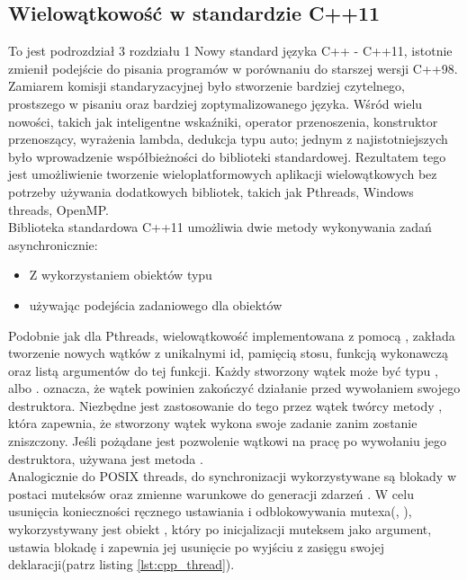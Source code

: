\documentclass[document.tex]{subfiles}
\begin{document}
\subsection{Wielowątkowość w standardzie C++11}
To jest podrozdział 3 rozdziału 1
\indent Nowy standard języka C++ - C++11, istotnie zmienił podejście do pisania programów w porównaniu do starszej wersji C++98. Zamiarem komisji standaryzacyjnej było stworzenie bardziej czytelnego, prostszego w pisaniu oraz bardziej zoptymalizowanego języka.
Wśród wielu nowości, takich jak inteligentne wskaźniki, operator przenoszenia, konstruktor przenoszący, wyrażenia lambda, dedukcja typu auto; jednym z najistotniejszych było wprowadzenie współbieżności do biblioteki standardowej.
Rezultatem tego jest umożliwienie tworzenie wieloplatformowych aplikacji 
wielowątkowych bez potrzeby używania dodatkowych bibliotek, takich jak Pthreads,
Windows threads, OpenMP.\cite{C++_Meyers}\cite{C++_Stroustrup}
\\
\indent Biblioteka standardowa C++11 umożliwia dwie metody wykonywania
zadań asynchronicznie\cite{C++_Meyers}\cite{C++11_iso}:
\begin{itemize}
\item Z wykorzystaniem obiektów typu 
\item używając podejścia zadaniowego dla obiektów 
\end{itemize}
\indent Podobnie jak dla Pthreads, wielowątkowość implementowana z pomocą
, zakłada tworzenie nowych wątków z unikalnymi id, 
pamięcią stosu, funkcją wykonawczą oraz listą argumentów do tej funkcji.
Każdy stworzony wątek może być typu , albo .
 oznacza, że wątek powinien zakończyć działanie przed
wywołaniem swojego destruktora. Niezbędne jest zastosowanie do tego 
przez wątek twórcy metody , która zapewnia, że stworzony
wątek wykona swoje zadanie zanim zostanie zniszczony. Jeśli pożądane
jest pozwolenie wątkowi na pracę po wywołaniu jego destruktora, 
używana jest metoda .\cite{C++11_iso}\cite{C++_Stroustrup}
\\
\indent Analogicznie do POSIX threads, do synchronizacji wykorzystywane są blokady w postaci muteksów   oraz zmienne warunkowe do generacji zdarzeń 
. W celu usunięcia konieczności ręcznego
ustawiania i odblokowywania mutexa(, ),
wykorzystywany jest obiekt , który po inicjalizacji
muteksem jako argument, ustawia blokadę i zapewnia jej usunięcie po wyjściu
z zasięgu swojej deklaracji(patrz listing \ref{lst:cpp_thread}).\cite{C++11_iso}\cite{C++11_tutorial}
\\

\end{document}
